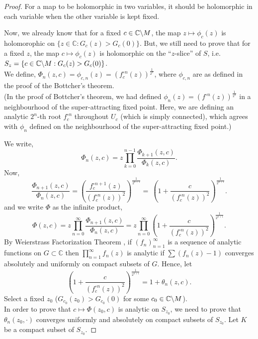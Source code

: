 \begin{proof}
	For a map to be holomorphic in two variables, it should be holomorphic in each variable
	when the other variable is kept fixed.

Now, we already know that for a fixed \( c\in \mathbb{C}\backslash M  \), the map \( z\mapsto \phi_c(z) \)
is holomorophic on \( \{z\in \mathbb{C}:G_c(z)>G_c(0)\} \).
But, we still need to prove that for a fixed \( z \), the map \( c\mapsto \phi_c(z) \)
is holomorphic on the ``\( z \)-slice'' of \( S \), i.e. \( S_{z}=\{c\in \mathbb{C}\backslash M:G_c(z)>G_c(0)\} \).\\
We define, \( \Phi_n(z,c)=\phi_{c,n}(z)=(f_c^{\circ n}(z))^{\frac{1}{2^n}} \), where \( \phi_{c,n} \)
are as defined in the proof of the Bottcher's theorem.\\
(In the proof of Bottcher's theorem, we had defined
\( \phi_n(z)=(f^{\circ n}(z))^{\frac{1}{2^n}} \) in a neighbourhood of the super-attracting fixed point. Here, we are defining an 
analytic \( 2^n \)-th root \( f_c^{\circ n} \) throughout \( U_c \) (which is simply connected), which agrees with \( \phi_n \)
defined on the neighbourhood of the super-attracting fixed point.)

\noindent We write, \[
\Phi_n(z,c)=z\prod_{k=0}^{n-1} \frac{\Phi_{k+1}(z,c)}{\Phi_k(z,c)}
.\]
Now, \[
	\frac{\Phi_{n+1}(z,c)}{\Phi_n(z,c)}=\left(\frac{f_c^{\circ n+1}(z)}{(f_c^{\circ n}(z))^2}\right)^{\frac{1}{2^{n+1}}}=\
\left(1+\frac{c}{(f_c^{\circ n}(z))^2}\right)^{\frac{1}{2^{n+1}}}
.\] 
and we write \( \Phi \) as the infinite product, \[
\Phi(z,c)=z\prod_{n=0}^{\infty} \frac{\Phi_{n+1}(z,c)}{\Phi_n(z,c)} =z \prod_{n=0}^{\infty} \left(1+\frac{c}{(f_c^{\circ n}(z))^2}\right)^{\frac{1}{2^{n+1}}}
.\] 
By Weierstrass Factorization Theorem \parencite[See][pg 167]{conway}, if \( (f_n)_{n=1}^{\infty} \) is a sequence of analytic functions on \( G \subset \mathbb{C} \)
then \( \prod_{n=1}^{\infty} f_n(z)  \) is analytic
if \( \sum(f_n(z)-1) \) converges absolutely and uniformly on compact subsets of \( G \).
Hence, let \[
	\left(1+\frac{c}{(f_c^{\circ n}(z))^2}\right)^{\frac{1}{2^{n+1}}}=1+\theta_n(z,c)
.\]
Select a fixed \( z_0 \) (\( G_{c_0}(z_0)>G_{c_0}(0) \) for some \( c_0  \in  \mathbb{C}\backslash M\)).\\
In order to prove that \( c\mapsto \Phi(z_0,c) \) is analytic on \( S_{z_0} \), 
we need to prove that \( \theta_n(z_0,\cdot) \) converges uniformly and absolutely on compact subsets of \( S_{z_0} \).
Let \( K \) be a compact subset of \( S_{z_0} \).


\end{proof}

